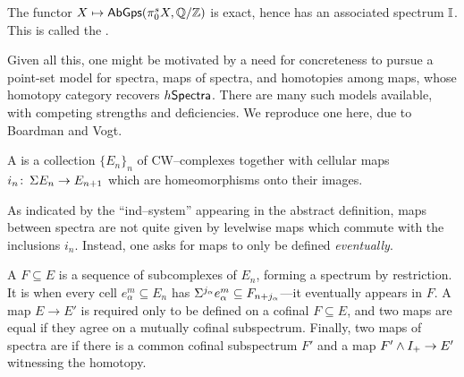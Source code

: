 \begin{example}
The functor $X \mapsto \mathsf{AbGps}(\pi_0^s X, \mathbb Q/\mathbb Z)$ is exact, hence has an associated spectrum $\mathbb I$.  This is called the .
\end{example}

Given all this, one might be motivated by a need for concreteness to pursue a point-set model for spectra, maps of spectra, and homotopies among maps, whose homotopy category recovers $h\mathsf{Spectra}$.
There are many such models available, with competing strengths and deficiencies.
We reproduce one here, due to Boardman and Vogt.

\begin{definition}
A  is a collection $\{E_n\}_n$ of CW--complexes together with cellular maps $i_n\colon\thinspace \Sigma E_n \to E_{n+1}$ which are homeomorphisms onto their images.
\end{definition}

As indicated by the ``ind--system'' appearing in the abstract definition, maps between spectra are not quite given by levelwise maps which commute with the inclusions $i_n$.%
Instead, one asks for maps to only be defined \emph{eventually}.

\begin{definition}
A  $F \subseteq E$ is a sequence of subcomplexes of $E_n$, forming a spectrum by restriction.
It is  when every cell $e^m_\alpha \subseteq E_n$ has $\Sigma^{j_\alpha} e^m_\alpha \subseteq F_{n+j_\alpha}$---it eventually appears in $F$.
A map $E \to E'$ is required only to be defined on a cofinal $F \subseteq E$, and two maps are equal if they agree on a mutually cofinal subspectrum.%
Finally, two maps of spectra are  if there is a common cofinal subspectrum $F'$ and a map $F' \wedge I_+ \to E'$ witnessing the homotopy.
\end{definition}

